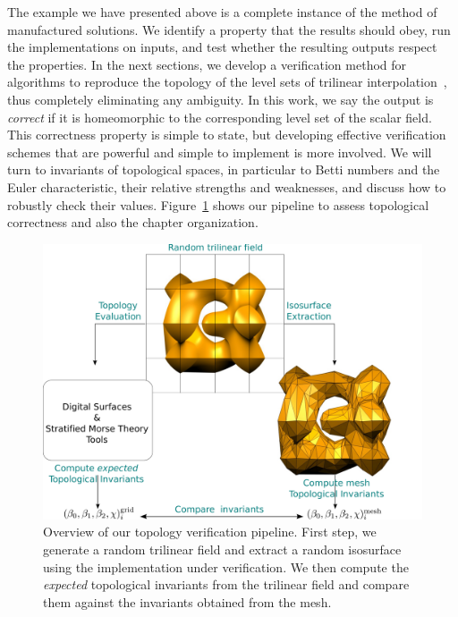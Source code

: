 The example we have presented above is a complete instance of the
method of manufactured solutions. We identify a property that the
results should obey, run the implementations on inputs, and test
whether the resulting outputs respect the properties.
%
In the next sections, we develop a verification method for algorithms
to reproduce the topology of the level sets of trilinear
interpolation~\cite{Chernyaev95marchingcubes,lopes:tvcg:2003,Nielson03onmarching},
thus completely eliminating any ambiguity. In this work, we say the
output is \emph{correct} if it is homeomorphic to the corresponding
level set of the scalar field.
%
This correctness property is simple to state, but developing effective
verification schemes that are powerful and simple to implement is more
involved. We will turn to invariants of topological spaces, in
particular to Betti numbers and the Euler characteristic, 
their relative strengths and weaknesses, and discuss how to robustly check
their values.  Figure~\ref{fig:pipeline} shows our pipeline to assess
topological correctness and also the chapter organization.

\begin{figure}[b]
\begin{center}
\includegraphics[width=1.0\linewidth,keepaspectratio=true]{chapter3/figures/pipeline.pdf}
\caption{Overview of our topology verification pipeline. First step,
  we generate a random trilinear field and extract a random isosurface
  using the implementation under verification. We then compute the
  \emph{expected} topological invariants from the trilinear field and
  compare them against the invariants obtained from the mesh. }
\label{fig:pipeline}
\end{center}
\end{figure}

